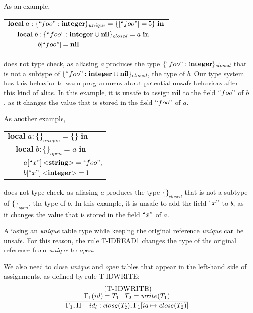 As an example,
\begin{center}
\begin{tabular}{lll}
\multicolumn{3}{l}{$\mathbf{local} \; a:\{``foo":\mathbf{integer}\}_{unique} = \{ [``foo"] = 5 \} \; \mathbf{in}$}\\
& \multicolumn{2}{l}{$\mathbf{local} \; b:\{``foo":\mathbf{integer} \cup \mathbf{nil} \}_{closed} = a \; \mathbf{in}$}\\
& & \multicolumn{1}{l}{$b[``foo"] = \mathbf{nil}$}
\end{tabular}
\end{center}
does not type check,
as aliasing $a$ produces the type $\{``foo":\mathbf{integer}\}_{closed}$
that is not a subtype of $\{``foo":\mathbf{integer} \cup \mathbf{nil}\}_{closed}$,
the type of $b$.
Our type system has this behavior to warn programmers about
potential unsafe behaviors after this kind of alias.
In this example, it is unsafe to assign $\mathbf{nil}$ to the field
$``foo"$ of $b$, as it changes the value that is stored in the field
$``foo"$ of $a$.

As another example,
\begin{center}
\begin{tabular}{lll}
\multicolumn{3}{l}{$\mathbf{local} \; a:\{\}_{unique} = \{\} \; \mathbf{in}$}\\
& \multicolumn{2}{l}{$\mathbf{local} \; b:\{\}_{open} = a \; \mathbf{in}$}\\
& & \multicolumn{1}{l}{$a[``x"] \; {<}\mathbf{string}{>} = ``foo";$}\\
& & \multicolumn{1}{l}{$b[``x"] \; {<}\mathbf{integer}{>} = 1$}\\
\end{tabular}
\end{center}
does not type check, as aliasing $a$ produces the type $\{\}_{closed}$
that is not a subtype of $\{\}_{open}$, the type of $b$.
In this example, it is unsafe to add the field $``x"$ to $b$,
as it changes the value that is stored in the field $``x"$ of $a$.

Aliasing an \emph{unique} table type while keeping the original
reference \emph{unique} can be unsafe.
For this reason, the rule \textsc{T-IDREAD1} changes the type of
the original reference from \emph{unique} to \emph{open}.

We also need to close \emph{unique} and \emph{open} tables that
appear in the left-hand side of assignments, as defined by
rule \textsc{T-IDWRITE}:
\[
\begin{array}{c}
\; (\textsc{T-IDWRITE})\\
\dfrac{\Gamma_{1}(id) = T_{1} \;\;\; T_{2} = write(T_{1})}
      {\Gamma_{1}, \Pi \vdash id_{l}:close(T_{2}), \Gamma_{1}[id \mapsto close(T_{2})]}
\end{array}
\]

